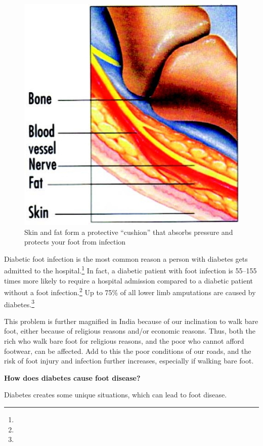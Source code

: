 {\begin{figure}
\caption{Skin and fat form a protective “cushion” that absorbs pressure and protects your foot from infection}
\includegraphics{images/056.jpg}
\end{figure}

Diabetic foot infection is the most common reason a person with diabetes gets admitted to the hospital.\footnote{} In fact, a diabetic patient with foot infection is 55–155 times more likely to require a hospital admission compared to a diabetic patient without a foot infection.\footnote{} Up to 75\% of all lower limb amputations are caused by diabetes.\footnote{}

This problem is further magnified in India because of our inclination to walk bare foot, either because of religious reasons and/or economic reasons. Thus, both the rich who walk bare foot for religious reasons, and the poor who cannot afford footwear, can be affected. Add to this the poor conditions of our roads, and the risk of foot injury and infection further increases, especially if walking bare foot.

\textbf{How does diabetes cause foot disease?}

Diabetes creates some unique situations, which can lead to foot disease.

}
